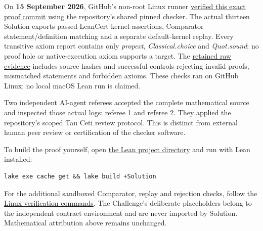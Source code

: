 \documentclass[11pt,a4paper]{article}
\makeatletter
\renewcommand{\subsection}{\Needspace{4\baselineskip}\@startsection{subsection}{2}{0pt}{9pt plus 1pt minus 1pt}{3pt}{\sffamily\bfseries\normalsize\color{ink}}}
\makeatother
\begin{document}
On \textbf{15 September 2026}, GitHub's non-root Linux runner
\href{https://github.com/sgstepaniants/OpenProblemsInNLA/actions/runs/35016473743/job/104541199904}{verified
this exact proof commit} using the repository's shared pinned checker.
The actual thirteen Solution exports passed LeanCert kernel assertions,
Comparator statement/definition matching and a separate default-kernel
replay. Every transitive axiom report contains only \textit{propext},
\textit{Classical.choice} and \textit{Quot.sound}; no proof hole or
native-execution axiom supports a target. The
\href{https://github.com/ajt60gaibb/OpenProblemsInNLA/blob/main/matrix-functions-and-stability/MF-02/lean/verification/linux-2026-09-15}{retained
raw evidence} includes source hashes and successful controls rejecting
invalid proofs, mismatched statements and forbidden axioms. These checks
ran on GitHub Linux; no local macOS Lean run is claimed.

Two independent AI-agent referees accepted the complete mathematical
source and inspected those actual logs:
\href{https://github.com/ajt60gaibb/OpenProblemsInNLA/blob/main/matrix-functions-and-stability/MF-02/lean/reviews/final/referee-elimination.md}{referee
1} and
\href{https://github.com/ajt60gaibb/OpenProblemsInNLA/blob/main/matrix-functions-and-stability/MF-02/lean/reviews/final/referee-inequalities.md}{referee
2}. They applied the repository's scoped Tau Ceti review protocol. This
is distinct from external human peer review or certification of the
checker software.

To build the proof yourself, open
\href{https://github.com/ajt60gaibb/OpenProblemsInNLA/blob/main/matrix-functions-and-stability/MF-02/lean/README.md}{the
Lean project directory} and run with Lean installed:

\begin{verbatim}
lake exe cache get && lake build +Solution
\end{verbatim}

For the additional sandboxed Comparator, replay and rejection checks,
follow the
\href{https://github.com/ajt60gaibb/OpenProblemsInNLA/blob/main/docs/lean/README.md}{Linux
verification commands}. The Challenge's deliberate placeholders belong
to the independent contract environment and are never imported by
Solution. Mathematical attribution above remains unchanged.

\newpage

\subsection{Context and notation}\label{context-and-notation}
\end{document}
